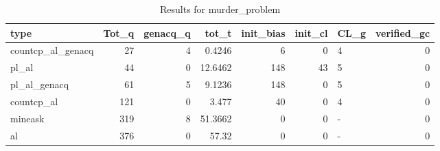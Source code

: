 \begin{table}[ht]
\caption{Results for murder_problem}
\begin{tabular}{lrrrrrlr}
\hline
 type              &   Tot\_q &   genacq\_q &   tot\_t &   init\_bias &   init\_cl & CL\_g   &   verified\_gc \\
\hline
 countcp\_al\_genacq &      27 &          4 &  0.4246 &           6 &         0 & 4      &             0 \\
 pl\_al             &      44 &          0 & 12.6462 &         148 &        43 & 5      &             0 \\
 pl\_al\_genacq      &      61 &          5 &  9.1236 &         148 &         0 & 5      &             0 \\
 countcp\_al        &     121 &          0 &  3.477  &          40 &         0 & 4      &             0 \\
 mineask           &     319 &          8 & 51.3662 &           0 &         0 & -      &             0 \\
 al                &     376 &          0 & 57.32   &           0 &         0 & -      &             0 \\
\hline
\end{tabular}
\end{table}